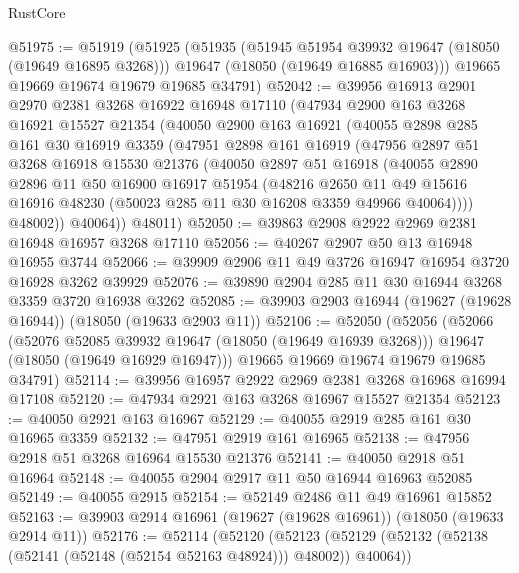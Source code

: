 \begin{lexlean}{RustCore}
\begin{coremodule}
@51975 := @51919
    (@51925
      (@51935
        (@51945 @51954 @39932 @19647 (@18050 (@19649 @16895 @3268)))
        @19647
        (@18050 (@19649 @16885 @16903)))
      @19665
      @19669
      @19674
      @19679
      @19685
      @34791)
@52042 := @39956
    @16913
    @2901
    @2970
    @2381
    @3268
    @16922
    @16948
    @17110
    (@47934
      @2900
      @163
      @3268
      @16921
      @15527
      @21354
      (@40050
        @2900
        @163
        @16921
        (@40055
          @2898
          @285
          @161
          @30
          @16919
          @3359
          (@47951
            @2898
            @161
            @16919
            (@47956
              @2897
              @51
              @3268
              @16918
              @15530
              @21376
              (@40050
                @2897
                @51
                @16918
                (@40055
                  @2890
                  @2896
                  @11
                  @50
                  @16900
                  @16917
                  @51954
                  (@48216
                    @2650
                    @11
                    @49
                    @15616
                    @16916
                    @48230
                    (@50023 @285 @11 @30 @16208 @3359 @49966 @40064))))
              @48002))
          @40064))
      @48011)
@52050 := @39863 @2908 @2922 @2969 @2381 @16948 @16957 @3268 @17110
@52056 := @40267 @2907 @50 @13 @16948 @16955 @3744
@52066 := @39909 @2906 @11 @49 @3726 @16947 @16954 @3720 @16928 @3262 @39929
@52076 := @39890 @2904 @285 @11 @30 @16944 @3268 @3359 @3720 @16938 @3262
@52085 := @39903 @2903 @16944 (@19627 (@19628 @16944)) (@18050 (@19633 @2903 @11))
@52106 := @52050
    (@52056
      (@52066
        (@52076 @52085 @39932 @19647 (@18050 (@19649 @16939 @3268)))
        @19647
        (@18050 (@19649 @16929 @16947)))
      @19665
      @19669
      @19674
      @19679
      @19685
      @34791)
@52114 := @39956 @16957 @2922 @2969 @2381 @3268 @16968 @16994 @17108
@52120 := @47934 @2921 @163 @3268 @16967 @15527 @21354
@52123 := @40050 @2921 @163 @16967
@52129 := @40055 @2919 @285 @161 @30 @16965 @3359
@52132 := @47951 @2919 @161 @16965
@52138 := @47956 @2918 @51 @3268 @16964 @15530 @21376
@52141 := @40050 @2918 @51 @16964
@52148 := @40055 @2904 @2917 @11 @50 @16944 @16963 @52085
@52149 := @40055 @2915
@52154 := @52149 @2486 @11 @49 @16961 @15852
@52163 := @39903 @2914 @16961 (@19627 (@19628 @16961)) (@18050 (@19633 @2914 @11))
@52176 := @52114
    (@52120
      (@52123 (@52129 (@52132 (@52138 (@52141 (@52148 (@52154 @52163 @48924))) @48002)) @40064))

\end{coremodule}
\end{lexlean}
